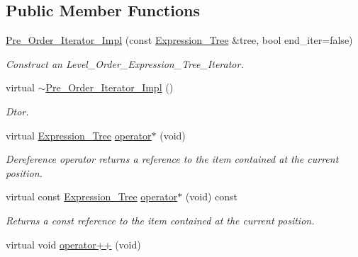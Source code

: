 \subsection*{Public Member Functions}
\begin{DoxyCompactItemize}
\item 
\hyperlink{classMadara_1_1Expression__Tree_1_1Pre__Order__Iterator__Impl_ae9258e7f01bac5cc04b07c4071c071a9}{Pre\_\-Order\_\-Iterator\_\-Impl} (const \hyperlink{classMadara_1_1Expression__Tree_1_1Expression__Tree}{Expression\_\-Tree} \&tree, bool end\_\-iter=false)
\begin{DoxyCompactList}\small\item\em Construct an Level\_\-Order\_\-Expression\_\-Tree\_\-Iterator. \item\end{DoxyCompactList}\item 
virtual \hyperlink{classMadara_1_1Expression__Tree_1_1Pre__Order__Iterator__Impl_a6a13fa66a63af182f7151a60e4b65dbe}{$\sim$Pre\_\-Order\_\-Iterator\_\-Impl} ()
\begin{DoxyCompactList}\small\item\em Dtor. \item\end{DoxyCompactList}\item 
virtual \hyperlink{classMadara_1_1Expression__Tree_1_1Expression__Tree}{Expression\_\-Tree} \hyperlink{classMadara_1_1Expression__Tree_1_1Pre__Order__Iterator__Impl_a3a491f3b5d18a6de2828f17096126374}{operator$\ast$} (void)
\begin{DoxyCompactList}\small\item\em Dereference operator returns a reference to the item contained at the current position. \item\end{DoxyCompactList}\item 
virtual const \hyperlink{classMadara_1_1Expression__Tree_1_1Expression__Tree}{Expression\_\-Tree} \hyperlink{classMadara_1_1Expression__Tree_1_1Pre__Order__Iterator__Impl_aa1f4f4d849b93afcd381d7c00b5f5696}{operator$\ast$} (void) const 
\begin{DoxyCompactList}\small\item\em Returns a const reference to the item contained at the current position. \item\end{DoxyCompactList}\item 
virtual void \hyperlink{classMadara_1_1Expression__Tree_1_1Pre__Order__Iterator__Impl_a3e99312077206f94ff55338d0265f864}{operator++} (void)

\end{DoxyCompactItemize}
